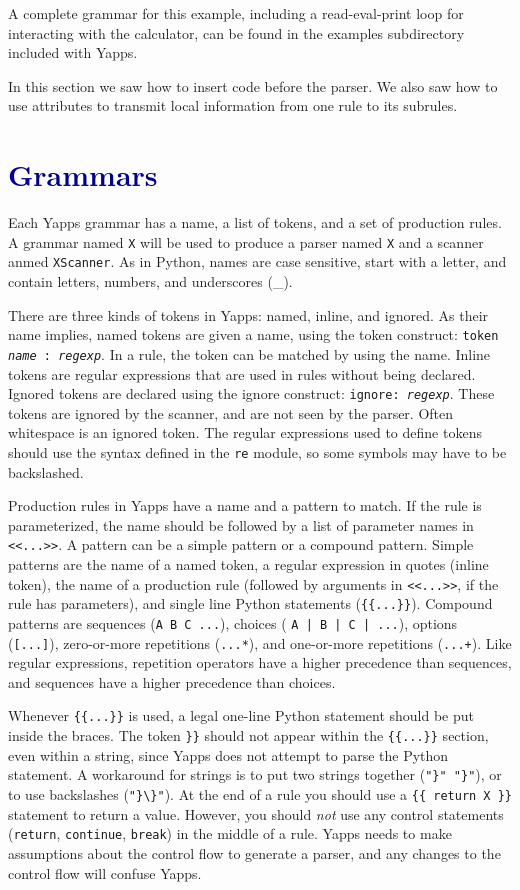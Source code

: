 \documentclass[10pt]{article}
\newcommand{\mysection}[1]{\section{\textcolor{darkblue}{#1}}}
\begin{document}
A complete grammar for this example, including a read-eval-print loop
for interacting with the calculator, can be found in the examples
subdirectory included with Yapps.

In this section we saw how to insert code before the parser.  We also
saw how to use attributes to transmit local information from one rule
to its subrules.

\mysection{Grammars}

Each Yapps grammar has a name, a list of tokens, and a set of
production rules.  A grammar named \texttt{X} will be used to produce
a parser named \texttt{X} and a scanner anmed \texttt{XScanner}.  As
in Python, names are case sensitive, start with a letter, and contain
letters, numbers, and underscores (\_).

There are three kinds of tokens in Yapps: named, inline, and ignored.
As their name implies, named tokens are given a name, using the token
construct: \texttt{token \emph{name} : \emph{regexp}}.  In a rule, the
token can be matched by using the name.  Inline tokens are regular
expressions that are used in rules without being declared.  Ignored
tokens are declared using the ignore construct: \texttt{ignore:
  \emph{regexp}}.  These tokens are ignored by the scanner, and are
not seen by the parser.  Often whitespace is an ignored token.  The
regular expressions used to define tokens should use the syntax
defined in the \texttt{re} module, so some symbols may have to be
backslashed.

Production rules in Yapps have a name and a pattern to match.  If the
rule is parameterized, the name should be followed by a list of
parameter names in \verb|<<...>>|.  A pattern can be a simple pattern
or a compound pattern.  Simple patterns are the name of a named token,
a regular expression in quotes (inline token), the name of a
production rule (followed by arguments in \verb|<<...>>|, if the rule
has parameters), and single line Python statements (\verb|{{...}}|).
Compound patterns are sequences (\verb|A B C ...|), choices (
\verb:A | B | C | ...:), options (\verb|[...]|), zero-or-more repetitions
(\verb|...*|), and one-or-more repetitions (\verb|...+|).  Like
regular expressions, repetition operators have a higher precedence
than sequences, and sequences have a higher precedence than choices.

Whenever \verb|{{...}}| is used, a legal one-line Python statement
should be put inside the braces.  The token \verb|}}| should not
appear within the \verb|{{...}}| section, even within a string, since
Yapps does not attempt to parse the Python statement.  A workaround
for strings is to put two strings together (\verb|"}" "}"|), or to use
backslashes (\verb|"}\}"|).  At the end of a rule you should use a
\verb|{{ return X }}| statement to return a value.  However, you
should \emph{not} use any control statements (\texttt{return},
\texttt{continue}, \texttt{break}) in the middle of a rule.  Yapps
needs to make assumptions about the control flow to generate a parser,
and any changes to the control flow will confuse Yapps.
\end{document}
